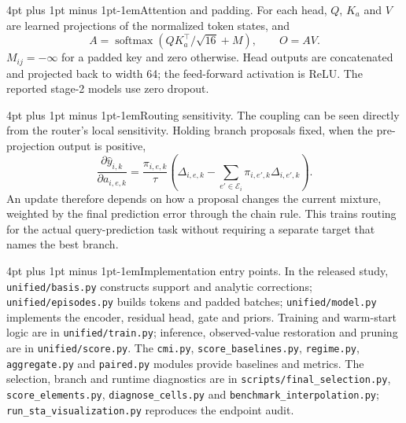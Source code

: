 \documentclass{article}
\makeatletter
\renewcommand{\paragraph}{\@startsection{paragraph}{4}{\z@}
  {4pt plus 1pt minus 1pt}{-1em}{\normalsize\bf}}
\makeatother
\begin{document}
\paragraph{Attention and padding.}
For each head, $Q$, $K_{\!a}$ and $V$ are learned projections of the normalized
token states, and
\begin{equation}
\label{eq:mhsa}
 A=\operatorname{softmax}\!\left(QK_{\!a}^{\top}/\sqrt{16}+M\right),
 \qquad O=AV.
\end{equation}
$M_{ij}=-\infty$ for a padded key and zero otherwise. Head outputs are
concatenated and projected back to width 64; the feed-forward activation is
ReLU. The reported stage-2 models use zero dropout.


\paragraph{Routing sensitivity.}
The coupling can be seen directly from the router's local sensitivity. Holding
branch proposals fixed, when the pre-projection output is positive,
\begin{equation}
\label{eq:gate-gradient}
 \frac{\partial\hat y_{i,k}}{\partial a_{i,e,k}}
 =\frac{\pi_{i,e,k}}{\tau}\left(
 \Delta_{i,e,k}-\sum_{e'\in\mathcal{E}_i}\pi_{i,e',k}\Delta_{i,e',k}\right).
\end{equation}
An update therefore depends on how a proposal changes the current mixture,
weighted by the final prediction error through the chain rule. This trains
routing for the actual query-prediction task without requiring a separate target
that names the best branch.


\begingroup\raggedright
\paragraph{Implementation entry points.}
\label{app:codemap}
In the released study, \texttt{unified/basis.py} constructs support and analytic
corrections; \texttt{unified/episodes.py} builds tokens and padded batches;
\texttt{unified/model.py} implements the encoder, residual head, gate and priors.
Training and warm-start logic are in \texttt{unified/train.py}; inference,
observed-value restoration and pruning are in \texttt{unified/score.py}.
The \texttt{cmi.py}, \texttt{score\_baselines.py}, \texttt{regime.py},
\texttt{aggregate.py} and \texttt{paired.py} modules provide baselines and
metrics. The selection, branch and runtime diagnostics are in
\texttt{scripts/final\_selection.py}, \texttt{score\_elements.py},
\texttt{diagnose\_cells.py} and \texttt{benchmark\_interpolation.py};
\texttt{run\_sta\_visualization.py} reproduces the endpoint audit.
\par\endgroup
\end{document}
